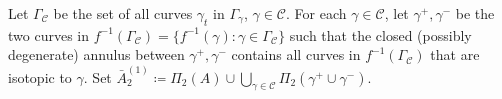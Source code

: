 \documentclass{amsart}
\theoremstyle{plain}
\theoremstyle{definition}
\theoremstyle{remark}
\newcommand{\reminder}[1]{\textsl{$\lhd\rhd$#1$\lhd\rhd$}\marginpar{$\lhd\rhd\lhd\rhd\lhd\rhd$}}%
\newcommand{\hide}[1]{}
\newcommand{\CC}{{\mathcal C}}
\begin{document}
Let $\Gamma_\CC$ be the set of all curves $\gamma_t$ in $\Gamma_\gamma$,  $\gamma\in \CC$. For each $\gamma\in \CC$, let $\gamma^+,\gamma^-$ be the two curves in $f^{-1}(\Gamma_\CC)= \{f^{-1}(\gamma)\colon \gamma \in \Gamma_\CC\}$ such that the closed (possibly degenerate) annulus between $\gamma^+,\gamma^-$ contains all curves in $f^{-1}(\Gamma_\CC)$ that are isotopic to $\gamma$. Set $\bar A_2^{(1)}\coloneq \Pi_2(A) \cup \bigcup_{\gamma\in \CC} \Pi_2(\gamma^+ \cup \gamma^-).$








  
\end{document}
